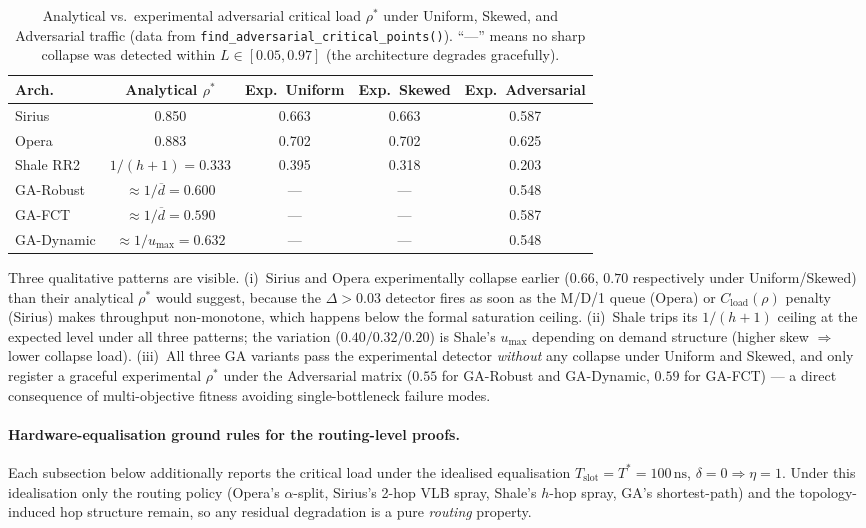 \documentclass{article}
\begin{document}
    \begin{table}[H]
        \centering
        \caption{Analytical vs.\ experimental adversarial critical load $\rho^*$ under Uniform, Skewed, and Adversarial traffic (data from \texttt{find\_adversarial\_critical\_points()}).  ``---'' means no sharp collapse was detected within $L \in [0.05, 0.97]$ (the architecture degrades gracefully).}
        \begin{tabular}{|l|c|c|c|c|}
            \hline
            \textbf{Arch.} & \textbf{Analytical} $\rho^*$ & \textbf{Exp.\ Uniform} & \textbf{Exp.\ Skewed} & \textbf{Exp.\ Adversarial} \\
            \hline
            Sirius     & 0.850 & 0.663 & 0.663 & 0.587 \\
            Opera      & 0.883 & 0.702 & 0.702 & 0.625 \\
            Shale RR2  & $1/(h{+}1) = 0.333$ & 0.395 & 0.318 & 0.203 \\
            GA-Robust  & $\approx 1/\overline{d} = 0.600$ & --- & --- & 0.548 \\
            GA-FCT     & $\approx 1/\overline{d} = 0.590$ & --- & --- & 0.587 \\
            GA-Dynamic & $\approx 1/u_{\max} = 0.632$ & --- & --- & 0.548 \\
            \hline
        \end{tabular}
        \label{tab:critical_points}
    \end{table}

    Three qualitative patterns are visible.  (i)~Sirius and Opera experimentally collapse earlier ($0.66$, $0.70$ respectively under Uniform/Skewed) than their analytical $\rho^*$ would suggest, because the $\Delta>0.03$ detector fires as soon as the M/D/1 queue (Opera) or $C_{\text{load}}(\rho)$ penalty (Sirius) makes throughput non-monotone, which happens below the formal saturation ceiling.  (ii)~Shale trips its $1/(h{+}1)$ ceiling at the expected level under all three patterns; the variation ($0.40/0.32/0.20$) is Shale's $u_{\max}$ depending on demand structure (higher skew $\Rightarrow$ lower collapse load).  (iii)~All three GA variants pass the experimental detector \emph{without} any collapse under Uniform and Skewed, and only register a graceful experimental $\rho^*$ under the Adversarial matrix ($0.55$ for GA-Robust and GA-Dynamic, $0.59$ for GA-FCT) --- a direct consequence of multi-objective fitness avoiding single-bottleneck failure modes.

    \paragraph{Hardware-equalisation ground rules for the routing-level proofs.}
    Each subsection below additionally reports the critical load under the idealised equalisation $T_{\text{slot}} = T^* = 100\,\text{ns}$, $\delta = 0 \Rightarrow \eta = 1$.  Under this idealisation only the routing policy (Opera's $\alpha$-split, Sirius's 2-hop VLB spray, Shale's $h$-hop spray, GA's shortest-path) and the topology-induced hop structure remain, so any residual degradation is a pure \emph{routing} property.
\end{document}
